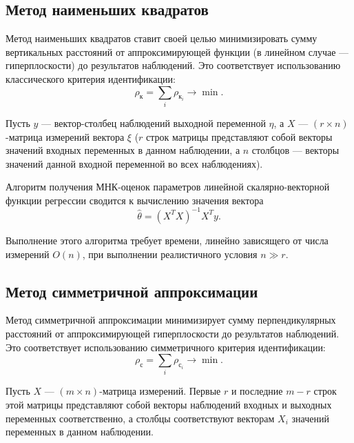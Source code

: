 \subsection{Метод наименьших квадратов}

Метод наименьших квадратов ставит своей целью минимизировать сумму вертикальных расстояний
от аппроксимирующей функции (в линейном случае --- гиперплоскости) до результатов наблюдений.
Это соответствует использованию классического критерия идентификации:
\begin{equation*}
  \rho_{\text{к}} = \sum_i \rho_{\text{к}_i} \rightarrow \min.
\end{equation*}

Пусть \( y \) --- вектор-столбец наблюдений выходной переменной \( \eta \),
а \( X \) --- \( (r \times n) \)-матрица измерений вектора \( \xi \)
(\( r \) строк матрицы представляют собой векторы значений входных переменных в данном наблюдении,
а \( n \) столбцов --- векторы значений данной входной переменной во всех наблюдениях).

Алгоритм получения МНК-оценок параметров линейной скалярно-векторной функции регрессии сводится
к вычислению значения вектора~\cite{wiki_lse}
\begin{equation*}
  \hat{\theta} = (X^{T}X)^{-1}X^{T} y.
\end{equation*}

Выполнение этого алгоритма требует времени, линейно зависящего от числа измерений \( O(n) \),
при выполнении реалистичного условия \( n \gg r \).

\vspace{2\baselineskip}
\subsection{Метод симметричной аппроксимации}

Метод симметричной аппроксимации минимизирует сумму перпендикулярных расстояний
от аппроксимирующей гиперплоскости до результатов наблюдений.
Это соответствует использованию симметричного критерия идентификации:
\begin{equation*}
  \rho_{\text{с}} = \sum_i \rho_{\text{с}_i} \rightarrow \min.
\end{equation*}

Пусть \( X \) --- \( (m \times n) \)-матрица измерений.
Первые \( r \) и последние \( m - r \) строк этой матрицы представляют собой векторы наблюдений
входных и выходных переменных соответственно,
а столбцы соответствуют векторам \( X_i \) значений переменных в данном наблюдении.

